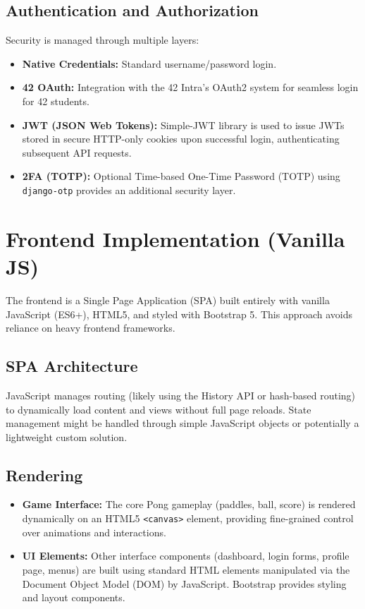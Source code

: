 \subsection{Authentication and Authorization}
Security is managed through multiple layers:
\begin{itemize}
    \item \textbf{Native Credentials:} Standard username/password login.
    \item \textbf{42 OAuth:} Integration with the 42 Intra's OAuth2 system for seamless login for 42 students.
    \item \textbf{JWT (JSON Web Tokens):} Simple-JWT library is used to issue JWTs stored in secure HTTP-only cookies upon successful login, authenticating subsequent API requests.
    \item \textbf{2FA (TOTP):} Optional Time-based One-Time Password (TOTP) using \texttt{django-otp} provides an additional security layer.
\end{itemize}

\section{Frontend Implementation (Vanilla JS)}
\label{sec:frontend_impl}
The frontend is a Single Page Application (SPA) built entirely with vanilla JavaScript (ES6+), HTML5, and styled with Bootstrap 5. This approach avoids reliance on heavy frontend frameworks.

\subsection{SPA Architecture}
JavaScript manages routing (likely using the History API or hash-based routing) to dynamically load content and views without full page reloads. State management might be handled through simple JavaScript objects or potentially a lightweight custom solution.

\subsection{Rendering}
\begin{itemize}
    \item \textbf{Game Interface:} The core Pong gameplay (paddles, ball, score) is rendered dynamically on an HTML5 \texttt{<canvas>} element, providing fine-grained control over animations and interactions.
    \item \textbf{UI Elements:} Other interface components (dashboard, login forms, profile page, menus) are built using standard HTML elements manipulated via the Document Object Model (DOM) by JavaScript. Bootstrap provides styling and layout components.
\end{itemize}

